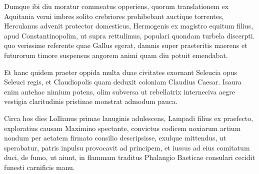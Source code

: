 Dumque ibi diu moratur commeatus opperiens, quorum translationem ex Aquitania verni imbres solito crebriores prohibebant auctique torrentes, Herculanus advenit protector domesticus, Hermogenis ex magistro equitum filius, apud Constantinopolim, ut supra rettulimus, populari quondam turbela discerpti. quo verissime referente quae Gallus egerat, damnis super praeteritis maerens et futurorum timore suspensus angorem animi quam diu potuit emendabat.

Et hanc quidem praeter oppida multa duae civitates exornant Seleucia opus Seleuci regis, et Claudiopolis quam deduxit coloniam Claudius Caesar. Isaura enim antehac nimium potens, olim subversa ut rebellatrix interneciva aegre vestigia claritudinis pristinae monstrat admodum pauca.

Circa hos dies Lollianus primae lanuginis adulescens, Lampadi filius ex praefecto, exploratius causam Maximino spectante, convictus codicem noxiarum artium nondum per aetatem firmato consilio descripsisse, exulque mittendus, ut sperabatur, patris inpulsu provocavit ad principem, et iussus ad eius comitatum duci, de fumo, ut aiunt, in flammam traditus Phalangio Baeticae consulari cecidit funesti carnificis manu.